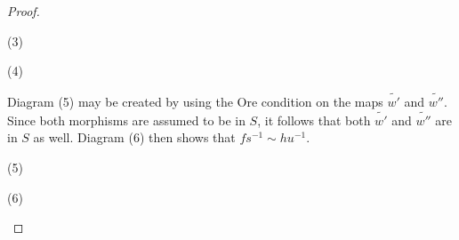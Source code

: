 \begin{proof}
\begin{itemize}
            \begin{center} (3)
                (4)
            \end{center}
            Diagram (5) may be created by using the Ore condition on the maps $\widetilde{w'}$ and $\widetilde{w''}$. Since both morphisms are assumed to be in $S$, it follows that both $\widetilde{w'}$ and $\widetilde{w''}$ are in $S$ as well. Diagram (6) then shows that $fs^{-1}\sim hu^{-1}$.
            \begin{center} (5)
                (6)
            \end{center}
        \end{itemize}
    \end{proof}

